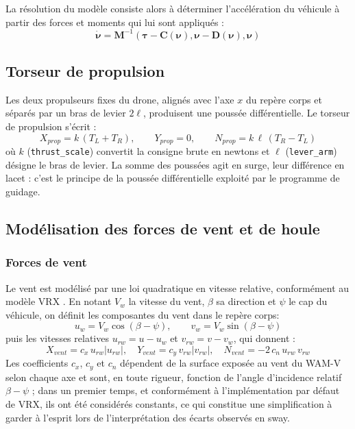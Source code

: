\documentclass{rapportEILCO}
\begin{document}
La résolution du modèle consiste alors à déterminer l'accélération du véhicule à partir des forces et moments qui lui sont appliqués :
\begin{equation}
	\dot{\boldsymbol{\nu}} =
	\boldsymbol{M}^{-1}
	\left(
	\boldsymbol{\tau}
	-
	\boldsymbol{C}(\boldsymbol{\nu}),\boldsymbol{\nu}
	-
	\boldsymbol{D}(\boldsymbol{\nu}),\boldsymbol{\nu}
	\right)
	\label{eq:nudot}
\end{equation}

	
	
	
	
	
	\subsection{Torseur de propulsion}
	
	Les deux propulseurs fixes du drone, alignés avec l'axe $x$ du repère corps et séparés par un bras de
	levier $2\ell$, produisent une poussée différentielle. Le torseur de propulsion s'écrit :
	\begin{equation}
		X_{prop} = k\,(T_L + T_R), \qquad Y_{prop} = 0, \qquad N_{prop} = k\,\ell\,(T_R - T_L)
		\label{eq:thrust}
	\end{equation}
	où $k$ (\texttt{thrust\_scale}) convertit la consigne brute en newtons et $\ell$ (\texttt{lever\_arm})
	désigne le bras de levier. La somme des poussées agit en surge, leur différence en lacet : c'est le
	principe de la poussée différentielle exploité par le programme de guidage.
	
	\subsection{Modélisation des forces de vent et de houle}
	
	\subsubsection{Forces de vent}
	
	Le vent est modélisé par une loi quadratique en vitesse relative, conformément au modèle VRX
	\cite{vrx}. En notant $V_w$ la vitesse du vent, $\beta$ sa direction et $\psi$ le cap du véhicule, on
	définit les composantes du vent dans le repère corps:
	\begin{equation}
		u_w = V_w \cos(\beta - \psi), \qquad v_w = V_w \sin(\beta - \psi)
	\end{equation}
	puis les vitesses relatives $u_{rw} = u - u_w$ et $v_{rw} = v - v_w$, qui donnent :
	\begin{equation}
		X_{vent} = c_x\,u_{rw}|u_{rw}|, \quad
		Y_{vent} = c_y\,v_{rw}|v_{rw}|, \quad
		N_{vent} = -2\,c_n\,u_{rw}\,v_{rw}
		\label{eq:vent}
	\end{equation}
	Les coefficients $c_x$, $c_y$ et $c_n$ dépendent de la surface exposée au vent du WAM-V selon chaque
	axe et sont, en toute rigueur, fonction de l'angle d'incidence relatif $\beta - \psi$ ; dans un premier
	temps, et conformément à l'implémentation par défaut de VRX, ils ont été considérés constants, ce qui
	constitue une simplification à garder à l'esprit lors de l'interprétation des écarts observés en sway.
	
\end{document}
